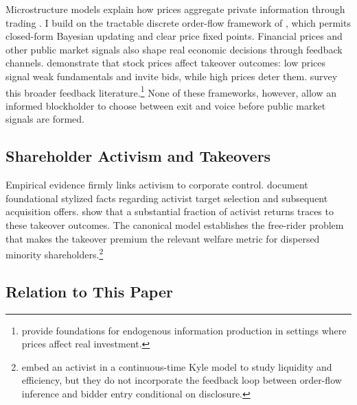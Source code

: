 \documentclass[11pt]{article}
\newcommand{\1}{\mathbf{1}}
\begin{document}
Microstructure models explain how prices aggregate private information through trading \citep{Kyle1985,GlostenMilgrom1985}. I build on the tractable discrete order-flow framework of \citet{EdmansGoldsteinJiang2015}, which permits closed-form Bayesian updating and clear price fixed points. Financial prices and other public market signals also shape real economic decisions through feedback channels. \citet{EdmansGoldsteinJiang2012} demonstrate that stock prices affect takeover outcomes: low prices signal weak fundamentals and invite bids, while high prices deter them. \citet{BondEdmansGoldstein2012} survey this broader feedback literature.\footnote{\citet{DowGoldsteinGuembel2017} provide foundations for endogenous information production in settings where prices affect real investment.} None of these frameworks, however, allow an informed blockholder to choose between exit and voice before public market signals are formed.

%
\subsection{Shareholder Activism and Takeovers}
%

Empirical evidence firmly links activism to corporate control. \citet{BravJiangPartnoyThomas2008} document foundational stylized facts regarding activist target selection and subsequent acquisition offers. \citet{GreenwoodSchor2009} show that a substantial fraction of activist returns traces to these takeover outcomes. The canonical \citet{GrossmanHart1980} model establishes the free-rider problem that makes the takeover premium the relevant welfare metric for dispersed minority shareholders.\footnote{\citet{BackEtAl2018} embed an activist in a continuous-time Kyle model to study liquidity and efficiency, but they do not incorporate the feedback loop between order-flow inference and bidder entry conditional on disclosure.}

%
\subsection{Relation to This Paper}
%
\end{document}

